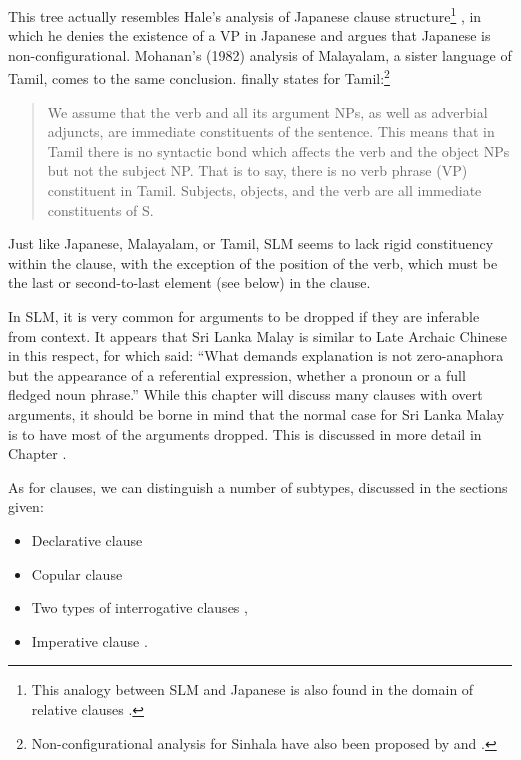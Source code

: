 This tree actually resembles Hale's analysis of Japanese clause structure\footnote{This analogy between SLM and Japanese is also found in the domain of relative clauses .} \citep{Hale1982japconf}, in which he denies the existence of a VP in Japanese and argues that Japanese is non-configurational. Mohanan's (1982) analysis of Malayalam, a sister language of Tamil, \nocite{Mohanan1982} comes to the same conclusion. \citet[177]{Lehmann1989} finally states for Tamil:\footnote{Non-configurational analysis for Sinhala have also been proposed by \citet{Gair1983} and \citet{Henadeerage2002}.}

\begin{quote}
We assume that the verb and all its argument NPs, as well as adverbial adjuncts, are immediate constituents of the sentence. This means that in Tamil there is no syntactic bond \el{} which affects the verb and the object NPs but not the subject NP. That is to say, there is no verb phrase (VP) constituent in Tamil. Subjects, objects, and the verb are all immediate constituents of S.
\end{quote}

Just like Japanese, Malayalam, or Tamil,  SLM seems to lack  rigid constituency within the clause, with the exception of the position of the verb, which must be the last or second-to-last element (see below) in the clause.

In SLM, it is very common for arguments to be dropped if they are inferable from context. It appears that Sri Lanka Malay is similar to Late Archaic Chinese in this respect, for which  \citet{Li1997zero} said: ``What demands explanation is not zero-anaphora \el{} but the appearance of a referential expression, whether a pronoun or a full fledged noun phrase.'' While this chapter will discuss many clauses with overt arguments, it should be borne in mind that the normal case for Sri Lanka Malay is to have most of the arguments dropped. This is discussed in more detail in Chapter .



As for clauses, we can distinguish a number of subtypes, discussed in the   sections given:

\begin{itemize}
 \item Declarative clause 
\item Copular clause 
\item Two types of interrogative clauses , 
\item Imperative clause .
\end{itemize} 

